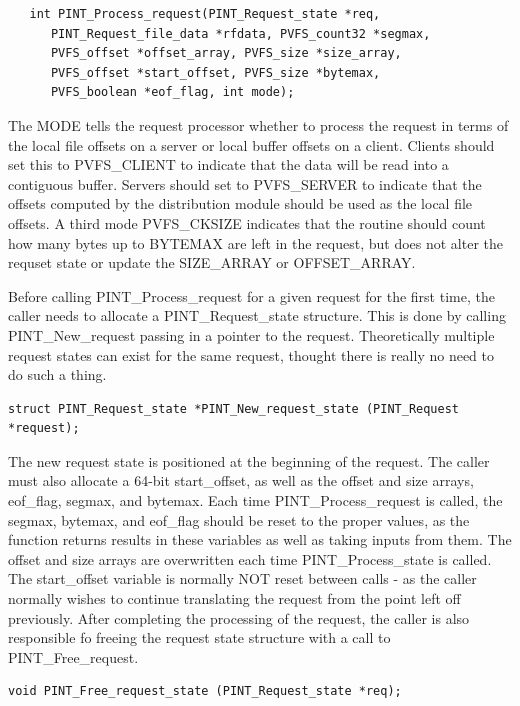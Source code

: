 \documentclass[12pt]{article} %
\begin{document}
\begin{verbatim}
   int PINT_Process_request(PINT_Request_state *req,
      PINT_Request_file_data *rfdata, PVFS_count32 *segmax,
      PVFS_offset *offset_array, PVFS_size *size_array,
      PVFS_offset *start_offset, PVFS_size *bytemax,
      PVFS_boolean *eof_flag, int mode);
\end{verbatim}

The MODE tells the request processor whether to process the
request in terms of the local file offsets on a server or local buffer
offsets on a client.  Clients should set this to PVFS\_CLIENT to
indicate that the data will be read into a contiguous buffer.  Servers
should set to PVFS\_SERVER to indicate that the offsets computed by the
distribution module should be used as the local file offsets.
A third mode PVFS\_CKSIZE indicates that the routine should count how
many bytes up to BYTEMAX are left in the request, but does not alter the
requset state or update the SIZE\_ARRAY or OFFSET\_ARRAY.

Before calling PINT\_Process\_request for a given request for the first
time, the caller needs to allocate a PINT\_Request\_state structure.
This is done by calling PINT\_New\_request passing in a pointer to the
request.  Theoretically multiple request states can exist for the same
request, thought there is really no need to do such a thing.

\begin{verbatim}
struct PINT_Request_state *PINT_New_request_state (PINT_Request *request);
\end{verbatim}

The new request state is positioned at the beginning of the request.
The caller must also allocate a 64-bit start\_offset, as well as
the offset and size arrays, eof\_flag, segmax, and bytemax.  Each time
PINT\_Process\_request is called, the segmax, bytemax, and eof\_flag
should be reset to the proper values, as the function returns results in
these variables as well as taking inputs from them.  The offset and size
arrays are overwritten each time PINT\_Process\_state is called.  The
start\_offset variable is normally NOT reset between calls - as the
caller normally wishes to continue translating the request from the
point left off previously.  After completing the processing of the
request, the caller is also responsible fo freeing the request state
structure with a call to PINT\_Free\_request.

\begin{verbatim}
void PINT_Free_request_state (PINT_Request_state *req);
\end{verbatim}
\end{document}

